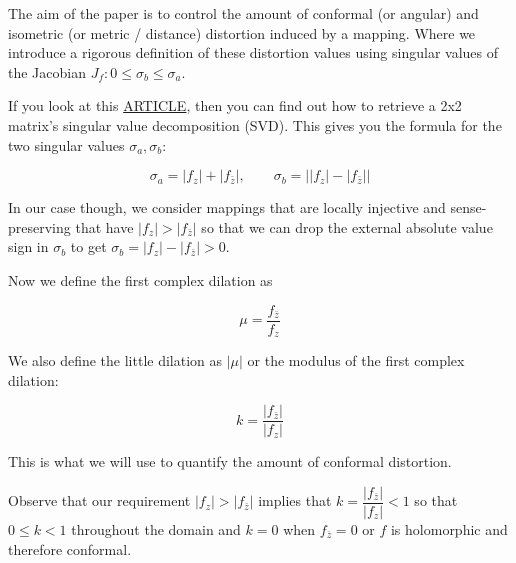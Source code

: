 The aim of the paper is to control the amount of conformal (or angular) and isometric (or metric / distance) distortion induced by a mapping. Where we introduce a rigorous definition of these distortion values using singular values of the Jacobian $J_f: 0 \leq \sigma_b \leq \sigma_a$. 

If you look at this \href{http://math.stackexchange.com/questions/861674/decompose-a-2d-arbitrary-transform-into-only-scaling-and-rotation}{ARTICLE}, then you can find out how to retrieve a 2x2 matrix's singular value decomposition (SVD). This gives you the formula for the two singular values $\sigma_a, \sigma_b$:

\begin{equation}
\label{eq:singular-values}
\sigma_a = |f_z| + |f_{\bar{z}}|, \qquad \sigma_b = \left||f_z| - |f_{\bar{z}}|\right|
\end{equation} 

In our case though, we consider mappings that are locally injective and sense-preserving that have $|f_z| > |f_{\bar{z}}|$ so that we can drop the external absolute value sign in $\sigma_b$ to get $\sigma_b = |f_z| - |f_{\bar{z}}| > 0$.

Now we define the first complex dilation as 

$$\mu = \dfrac{f_{\bar{z}}}{f_z}$$

We also define the little dilation as $|\mu|$ or the modulus of the first complex dilation:

$$k = \dfrac{|f_{\bar{z}}|}{|f_z|}$$

This is what we will use to quantify the amount of conformal distortion. %

Observe that our requirement $|f_z| > |f_{\bar{z}}|$ implies that $k = \dfrac{|f_{\bar{z}}|}{|f_z|} < 1$ so that $0 \leq k < 1$ throughout the domain and $k = 0$ when $f_{\bar{z}} = 0$ or $f$ is holomorphic and therefore conformal.













